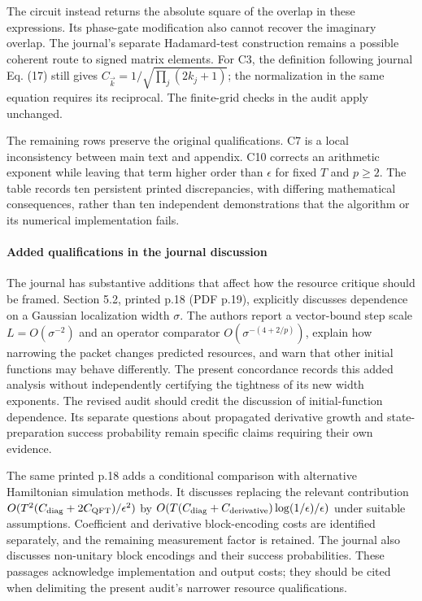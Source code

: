 The circuit instead returns the absolute square of the overlap in these
expressions. Its phase-gate modification also cannot recover the
imaginary overlap. The journal's separate Hadamard-test construction
remains a possible coherent route to signed matrix elements. For C3, the
definition following journal Eq. (17) still gives
\(C_{\vec k}=1/\sqrt{\prod_j(2k_j+1)}\); the normalization in the same
equation requires its reciprocal. The finite-grid checks in the audit
apply unchanged.

The remaining rows preserve the original qualifications. C7 is a local
inconsistency between main text and appendix. C10 corrects an arithmetic
exponent while leaving that term higher order than \(\epsilon\) for
fixed \(T\) and \(p\geq2\). The table records ten persistent printed
discrepancies, with differing mathematical consequences, rather than ten
independent demonstrations that the algorithm or its numerical
implementation fails.

\paragraph{Added qualifications in the journal
discussion}\label{added-qualifications-in-the-journal-discussion}

The journal has substantive additions that affect how the resource
critique should be framed. Section 5.2, printed p.18 (PDF p.19),
explicitly discusses dependence on a Gaussian localization width
\(\sigma\). The authors report a vector-bound step scale
\(L=O(\sigma^{-2})\) and an operator comparator
\(O(\sigma^{-(4+2/p)})\), explain how narrowing the packet changes
predicted resources, and warn that other initial functions may behave
differently. The present concordance records this added analysis without
independently certifying the tightness of its new width exponents. The
revised audit should credit the discussion of initial-function
dependence. Its separate questions about propagated derivative growth
and state-preparation success probability remain specific claims
requiring their own evidence.

The same printed p.18 adds a conditional comparison with alternative
Hamiltonian simulation methods. It discusses replacing the relevant
contribution \(O(T^2(C_{\rm diag}+2C_{\rm QFT})/\epsilon^2)\) by
\(O(T(C_{\rm diag}+C_{\rm derivative})\log(1/\epsilon)/\epsilon)\) under
suitable assumptions. Coefficient and derivative block-encoding costs
are identified separately, and the remaining measurement factor is
retained. The journal also discusses non-unitary block encodings and
their success probabilities. These passages acknowledge implementation
and output costs; they should be cited when delimiting the present
audit's narrower resource qualifications.

